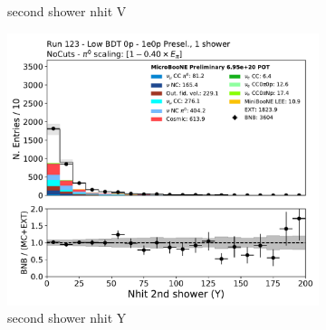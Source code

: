 \begin{figure}[H]
\begin{subfigure}{0.3\textwidth}
    \caption{second shower nhit V}
    \end{subfigure}
    \begin{subfigure}{0.3\textwidth}
    \includegraphics[width=1.0\textwidth]{1e0p/Low_BDT_Sideband/secondshower_Y_nhit.pdf}
    \caption{second shower nhit Y}
    \end{subfigure}
    \caption{} 
    \label{fig:HE_1eNp_1}
\end{figure}

